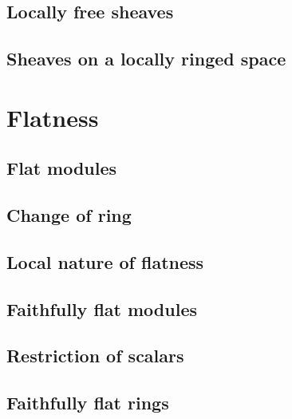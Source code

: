 \documentclass[10pt,oneside]{amsart}
\begin{document}
        \subsection{Locally free sheaves}
        

        \subsection{Sheaves on a locally ringed space}
        

    \section{Flatness}

        \subsection{Flat modules}
        

        \subsection{Change of ring}
        

        \subsection{Local nature of flatness}
        

        \subsection{Faithfully flat modules}
        

        \subsection{Restriction of scalars}
        

        \subsection{Faithfully flat rings}
        
\end{document}
